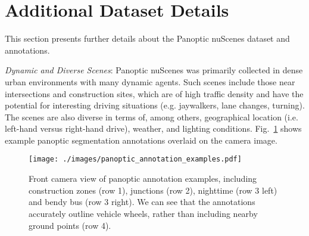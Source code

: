 \documentclass[letterpaper, 10 pt, journal, twoside]{IEEEtran}
\newcommand{\figref}[1]{Fig.~\ref{#1}}
\begin{document}
\section{Additional Dataset Details}
This section presents further details about the Panoptic nuScenes dataset and annotations.

\noindent\textit{Dynamic and Diverse Scenes}: Panoptic nuScenes was primarily collected in dense urban environments with many dynamic agents. Such scenes include those near intersections and construction sites, which are of high traffic density and have the potential for interesting driving situations (e.g. jaywalkers, lane changes, turning). The scenes are also diverse in terms of, among others, geographical location (i.e. left-hand versus right-hand drive), weather, and lighting conditions. \figref{fig:annnotation_example} shows example panoptic segmentation annotations overlaid on the camera image.

\begin{figure}
\centering
\texttt{[image: ./images/panoptic\_annotation\_examples.pdf]}
\caption{Front camera view of panoptic annotation examples, including construction zones (row 1), junctions (row 2), nighttime (row 3 left) and bendy bus (row 3 right). 
We can see that the annotations accurately outline vehicle wheels, rather than including nearby ground points (row 4).}
\label{fig:annnotation_example}
\end{figure}
\end{document}
